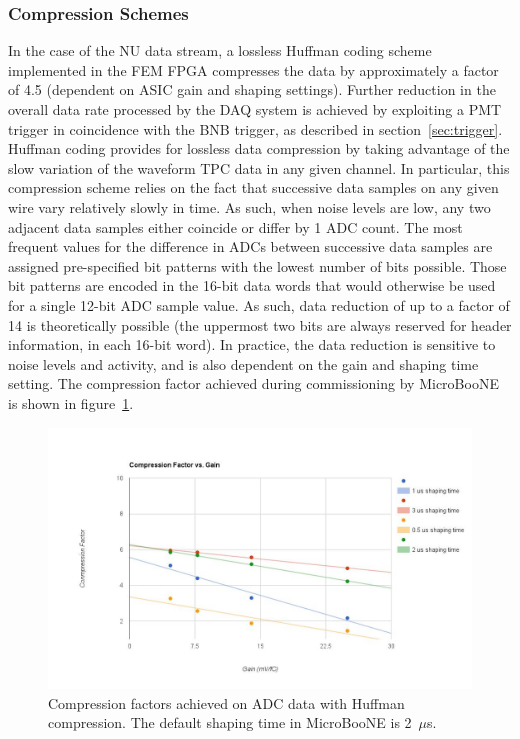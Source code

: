 

\subsubsection{Compression Schemes}
\label{sec:tpccomp}

In the case of the NU data stream, a lossless Huffman coding scheme implemented in the FEM FPGA compresses the data by approximately a factor of 4.5 (dependent on ASIC gain and shaping settings). Further reduction in the overall data rate processed by the DAQ system is achieved by exploiting a PMT trigger in coincidence with the BNB trigger, as described in section~\ref{sec:trigger}. Huffman coding provides for lossless data compression by taking advantage of the slow variation of the waveform TPC data in any given channel. In particular, this compression scheme relies on the fact that successive data samples on any given wire vary relatively slowly in time. As such, when noise levels are low, any two adjacent data samples either coincide or differ by 1 ADC count. The most frequent values for the difference in ADCs between successive data samples are assigned pre-specified bit patterns with the lowest number of bits possible. Those bit patterns are encoded in the 16-bit data words that would otherwise be used for a single 12-bit ADC sample value. As such, data reduction of up to a factor of 14 is theoretically possible (the uppermost two bits are always reserved for header information, in each 16-bit word). In practice, the data reduction is sensitive to noise levels and \lartpc activity, and is also dependent on the gain and shaping time setting. The compression factor achieved during commissioning by MicroBooNE is shown in figure~\ref{fig:readout_6}.

\begin{figure}
\centering
\includegraphics[width=0.8\linewidth]{./figures/readout_6.jpg}%
\caption{\label{fig:readout_6}Compression factors achieved on ADC data with Huffman compression.  The default shaping time in MicroBooNE is 2~$\mu$s.}
\end{figure}


